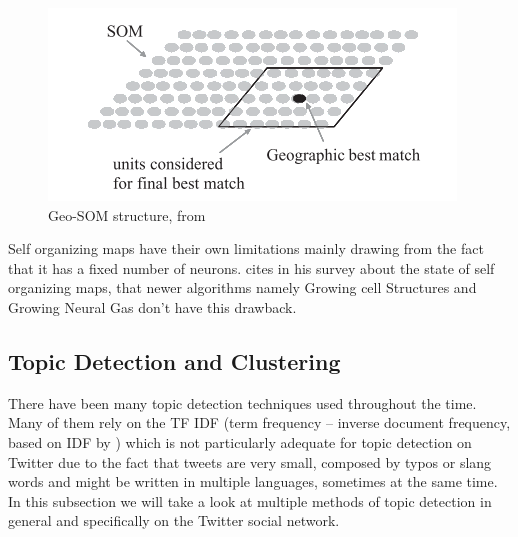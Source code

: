 \begin{figure}[tb]
  \begin{center}
    \includegraphics[]{images/6_geo-som.png}
  \end{center}
  \caption{Geo-SOM structure, from \citet{Bacao2005}}
  \label{fig:geo_som}
\end{figure}


Self organizing maps have their own limitations mainly drawing from the fact that it has a fixed number of neurons. \citet{Qiang2010} cites in his survey about the state of self organizing maps, that newer algorithms namely Growing cell Structures \cite{Fritzke1995} and Growing Neural Gas \cite{Fritzke1994} don't have this drawback.



\subsection{Topic Detection and Clustering} %
\label{sub:topic_detection_on_twitter}
There have been many topic detection techniques used throughout the time. Many of them rely on the TF IDF (term frequency – inverse document frequency, based on IDF by \citet{Jones2004}) which is not particularly adequate for topic detection on Twitter due to the fact that tweets are very small, composed by typos or slang words and might be written in multiple languages, sometimes at the same time. In this subsection we will take a look at multiple methods of topic detection in general and specifically on the Twitter social network.

